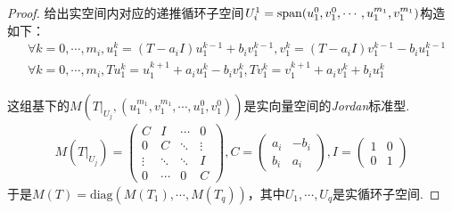 \begin{proof}
    给出实空间内对应的递推循环子空间\(U_i^1=\operatorname{span}(u_1^0,v_1^0,\cdots,u_1^{m_1},v_1^{m_1})\)构造如下：
    \begin{align*}
        &\forall k=0,\cdots,m_i,u_1^k=(T-a_iI)u_1^{k-1}+b_i v_1^{k-1},v_1^k=(T-a_iI)v_1^{k-1}-b_i u_1^{k-1} \\
        &\forall k=0,\cdots,m_i,Tu_1^k=u_1^{k+1}+a_i u_1^k-b_i v_1^k,Tv_1^k=v_1^{k+1}+a_i v_1^k+b_i u_1^k
    \end{align*}
        \begin{comment}
            \(u^k,v^k\)的显式构造如下：
            \begin{align*}
                &u_k=\sum_{j=0}^k C_k^j (-b)^{k-j} (T-aI)^j u_0+\sum_{j=0}^k C_{k-1}^j (-b)^{k-j-1} (T-aI)^j v_0 \\
                &v_k=\sum_{j=0}^k C_k^j (-b)^{k-j} (T-aI)^j v_0-\sum_{j=0}^k C_{k-1}^j (-b)^{k-j-1} (T-aI)^j u_0
            \end{align*}
            因此若存在\(p<m_1+1\)使得\((T-a_iI)^p u_1^0=0\)或\((T-a_iI)^p v_1^0=0\)，那么
            \begin{align*}
                u_1^p/v_1^p \in \altspan(u_1^{p-1},v_1^{p-1},\cdots,u_1^0,v_1^0)
            \end{align*}
            从而导致递推链出现冗余，因此\(u,v,(u,v)\)的幂零指数严格相等.
        \end{comment}
    这组基下的\(M(T|_{U_j},(u_1^{m_1},v_1^{m_1},\cdots,u_1^0,v_1^0))\)是实向量空间的\textit{Jordan}标准型.
    \begin{align*}
        M(T|_{U_j})=
        \begin{pmatrix}
            C      & I       & \cdots & 0      \\
            0      & C       & \ddots & \vdots \\
            \vdots & \ddots  & \ddots & I      \\
            0      & \cdots  & 0      & C
        \end{pmatrix}
        ,C=
        \begin{pmatrix}
            a_i & -b_i \\
            b_i & a_i
        \end{pmatrix}
        ,I=
        \begin{pmatrix}
            1 & 0 \\
            0 & 1
        \end{pmatrix}
    \end{align*}
    于是\(M(T)=\mathrm{diag}(M(T_1),\cdots,M(T_q))\)，其中\(U_1,\cdots,U_q\)是实循环子空间.
\end{proof}

